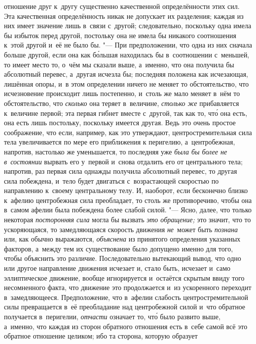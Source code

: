 отношение друг к~другу существенно качественной определённости этих сил. Эта
качественная определённость никак не допускает их разделения; каждая из них
имеет значение лишь в~связи с~другой; следовательно, поскольку одна имела бы
избыток перед другой, постольку она не имела бы никакого соотношения к~этой
другой и~её не было бы. "--- При предположении, что одна из них сначала больше
другой, если она как б\'{о}льшая находилась бы в~соотношении с~меньшей, то
имеет место то, о~чём мы сказали выше, а~именно, что она получила бы абсолютный
перевес, а~другая исчезла бы; последняя положена как исчезающая, лишённая
опоры, и~в этом определении ничего не меняет то обстоятельство, что
исчезновение происходит лишь постепенно, и~столь же мало меняет в~нём то
обстоятельство, что {\em сколько} она теряет в~величине, {\em столько же}
прибавляется к~величине первой; эта первая гибнет вместе с~другой, так как то,
чт\'{о} она есть, она есть лишь постольку, поскольку имеется другая. Ведь это
очень простое соображение, что если, например, как это утверждают,
центростремительная сила тела увеличивается по мере его приближения к
перигелию, а~центробежная, напротив, настолько же уменьшается, то последняя уже
{\em была бы более не в~состоянии} вырвать его у~первой и~снова отдалить его от
центрального тела; напротив, раз первая сила однажды получила абсолютный
перевес, то другая сила побеждена, и~тело будет двигаться с~возрастающей
скоростью по направлению к~своему центральному телу. И, наоборот, если
бесконечно близко к~афелию центробежная сила преобладает, то столь же
противоречиво, чтобы она в~самом афелии была побеждена более слабой силой. "---
Ясно, далее, что только некоторая {\em посторонняя сила} могла бы вызвать
{\em это обращение;} это значит, что то ускоряющаяся, то замедляющаяся
скорость движения {\em не}~может быть {\em познана} или, как обычно выражаются,
{\em объяснена} из принятого определения
указанных факторов, а~между тем их существование было
допущено именно для того, чтобы объяснить это различие. Последовательно
вытекающий вывод, что одно или другое направление движения исчезает и, стало
быть, исчезает и~само эллиптическое движение, вообще игнорируется и~остаётся
скрытым ввиду того несомненного факта, что движение это продолжается и~из
ускоренного переходит в~замедляющееся. Предположение, что в~афелии слабость
центростремительной силы превращается в~её преобладание над центробежной силой
и~что обратное получается в~перигелии, {\em отчасти} означает то, чт\'{о} было
развито выше, а~именно, что каждая из сторон обратного отношения есть в~себе
самой всё это обратное отношение целиком; ибо та сторона, которую образует
